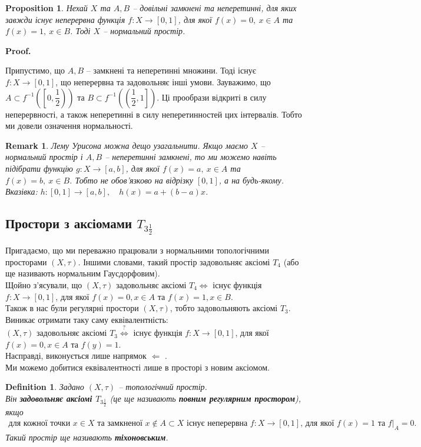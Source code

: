 \documentclass[a4paper, 10pt]{article}
\makeatletter
\def\leftproof{$\boxed{\Leftarrow}$ }
\theoremstyle{theoremdd}
\newtheorem{definition}[theorem]{Definition}
\newtheorem{proposition}[theorem]{Proposition}
\newtheorem{remark}[theorem]{Remark}
\renewenvironment{proof}[1][Proof.\\]{\par
\pushQED{\hfill \qed}%
\normalfont \topsep6\p@\@plus6\p@\relax
\trivlist
\item\relax
{\bfseries
#1\@addpunct{.}}\hspace\labelsep\ignorespaces
}{%
\popQED\endtrivlist\@endpefalse
}
\makeatother
\begin{document}
\begin{proposition}
Нехай $X$ та $A,B$ -- довільні замкнені та неперетинні, для яких завжди існує неперервна функція $f \colon X \to [0,1]$, для якої $f(x) = 0,\ x \in A$ та $f(x) = 1,\ x \in B$. Тоді $X$ -- нормальний простір.
\end{proposition}

\begin{proof}
Припустимо, що $A,B$ -- замкнені та неперетинні множини. Тоді існує $f \colon X \to [0,1]$, що неперервна та задовольняє інші умови. Зауважимо, що $A \subset f^{-1} \left(\left[0, \dfrac{1}{2}\right)\right)$ та $B \subset f^{-1}\left(\left(\dfrac{1}{2},1\right]\right)$. Ці прообрази відкриті в силу неперервності, а також неперетинні в силу неперетинностей цих інтервалів. Тобто ми довели означення нормальності.
\end{proof}

\begin{remark}
Лему Урисона можна дещо узагальнити. Якщо маємо $X$ -- нормальний простір і $A,B$ -- неперетинні замкнені, то ми можемо навіть підібрати функцію $g \colon X \to [a,b]$, для якої $f(x) = a,\ x \in A$ та $f(x) = b,\ x \in B$. Тобто не обов'язково на відрізку $[0,1]$, а на будь-якому.\\
\textit{Вказівка: $h \colon [0,1] \to [a,b],\quad h(x) = a + (b-a)x$.}
\end{remark}

\subsection{Простори з аксіомами $T_{3 \frac{1}{2} }$}
Пригадаємо, що ми переважно працювали з нормальними топологічними просторами $(X,\tau)$. Іншими словами, такий простір задовольняє аксіомі $T_4$ (або ще називають нормальним Гаусдорфовим).\\
Щойно з'ясували, що $(X,\tau)$ задовольняє аксіомі $T_4 \iff$ існує функція $f \colon X \to [0,1]$, для якої $f(x) = 0, x \in A$ та $f(x) = 1, x \in B$.
\bigskip \\
Також в нас були регулярні простори $(X,\tau)$, тобто задовольняють аксіомі $T_3$. Виникає отримати таку саму еквівалентність:\\
$(X,\tau)$ задовольняє аксіомі $T_3 \overset{?}{\iff}$ існує функція $f \colon X \to [0,1]$, для якої $f(x) = 0, x \in A$ та $f(y) = 1$.\\
Насправді, виконується лише напрямок \leftproof. \\
Ми можемо добитися еквівалентності лише в просторі з новим аксіомом.
\begin{definition}
Задано $(X,\tau)$ -- топологічний простір.\\
Він \textbf{задовольняє аксіомі $T_{3 \frac{1}{2}}$} (це ще називають \textbf{повним регулярним простором}), якщо
\begin{align*}
\text{для кожної точки $x \in X$ та замкненої $x \notin A \subset X$ існує неперервна $f \colon X \to [0,1]$, для якої $f(x) = 1$ та $f|_A = 0$.}
\end{align*}
Такий простір ще називають \textbf{тіхоновським}.
\end{definition}
\end{document}
